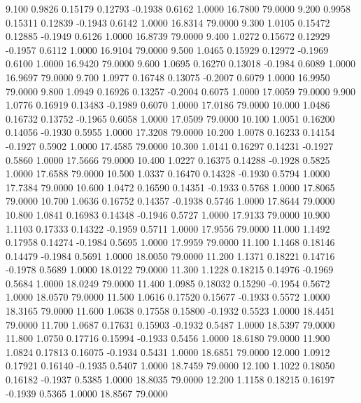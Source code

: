    9.100   0.9826   0.15179   0.12793  -0.1938   0.6162   1.0000  16.7800  79.0000
   9.200   0.9958   0.15311   0.12839  -0.1943   0.6142   1.0000  16.8314  79.0000
   9.300   1.0105   0.15472   0.12885  -0.1949   0.6126   1.0000  16.8739  79.0000
   9.400   1.0272   0.15672   0.12929  -0.1957   0.6112   1.0000  16.9104  79.0000
   9.500   1.0465   0.15929   0.12972  -0.1969   0.6100   1.0000  16.9420  79.0000
   9.600   1.0695   0.16270   0.13018  -0.1984   0.6089   1.0000  16.9697  79.0000
   9.700   1.0977   0.16748   0.13075  -0.2007   0.6079   1.0000  16.9950  79.0000
   9.800   1.0949   0.16926   0.13257  -0.2004   0.6075   1.0000  17.0059  79.0000
   9.900   1.0776   0.16919   0.13483  -0.1989   0.6070   1.0000  17.0186  79.0000
  10.000   1.0486   0.16732   0.13752  -0.1965   0.6058   1.0000  17.0509  79.0000
  10.100   1.0051   0.16200   0.14056  -0.1930   0.5955   1.0000  17.3208  79.0000
  10.200   1.0078   0.16233   0.14154  -0.1927   0.5902   1.0000  17.4585  79.0000
  10.300   1.0141   0.16297   0.14231  -0.1927   0.5860   1.0000  17.5666  79.0000
  10.400   1.0227   0.16375   0.14288  -0.1928   0.5825   1.0000  17.6588  79.0000
  10.500   1.0337   0.16470   0.14328  -0.1930   0.5794   1.0000  17.7384  79.0000
  10.600   1.0472   0.16590   0.14351  -0.1933   0.5768   1.0000  17.8065  79.0000
  10.700   1.0636   0.16752   0.14357  -0.1938   0.5746   1.0000  17.8644  79.0000
  10.800   1.0841   0.16983   0.14348  -0.1946   0.5727   1.0000  17.9133  79.0000
  10.900   1.1103   0.17333   0.14322  -0.1959   0.5711   1.0000  17.9556  79.0000
  11.000   1.1492   0.17958   0.14274  -0.1984   0.5695   1.0000  17.9959  79.0000
  11.100   1.1468   0.18146   0.14479  -0.1984   0.5691   1.0000  18.0050  79.0000
  11.200   1.1371   0.18221   0.14716  -0.1978   0.5689   1.0000  18.0122  79.0000
  11.300   1.1228   0.18215   0.14976  -0.1969   0.5684   1.0000  18.0249  79.0000
  11.400   1.0985   0.18032   0.15290  -0.1954   0.5672   1.0000  18.0570  79.0000
  11.500   1.0616   0.17520   0.15677  -0.1933   0.5572   1.0000  18.3165  79.0000
  11.600   1.0638   0.17558   0.15800  -0.1932   0.5523   1.0000  18.4451  79.0000
  11.700   1.0687   0.17631   0.15903  -0.1932   0.5487   1.0000  18.5397  79.0000
  11.800   1.0750   0.17716   0.15994  -0.1933   0.5456   1.0000  18.6180  79.0000
  11.900   1.0824   0.17813   0.16075  -0.1934   0.5431   1.0000  18.6851  79.0000
  12.000   1.0912   0.17921   0.16140  -0.1935   0.5407   1.0000  18.7459  79.0000
  12.100   1.1022   0.18050   0.16182  -0.1937   0.5385   1.0000  18.8035  79.0000
  12.200   1.1158   0.18215   0.16197  -0.1939   0.5365   1.0000  18.8567  79.0000
